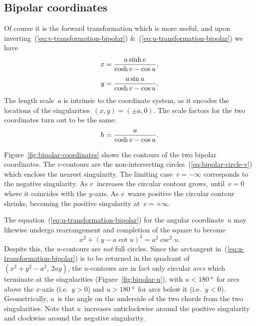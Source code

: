\subsection{Bipolar coordinates}
\label{sec:bipolar.known.coordinates}

Of course it is the forward transformation which is more useful,
and upon inverting~(\ref{eq:v-transformation-bipolar})
\&~(\ref{eq:u-transformation-bipolar})
we have
\begin{align}
  x &= \frac{a \sinh v}{\cosh v - \cos u},
    \label{eq:x-transformation-bipolar}
    \\[\tallspace]
  y &= \frac{a \sin u}{\cosh v - \cos u}.
    \label{eq:y-transformation-bipolar}
\end{align}
The length scale~$a$ is intrinsic to the coordinate system,
as it encodes the locations of the singularities~$(x, y) = (\pm a, 0)$.
The scale factors for the two coordinates turn out to be the same:
\begin{equation}
  \scalefac = \frac{a}{\cosh v - \cos u}.
  \label{eq:scale-factor-bipolar}
\end{equation}

\begin{figure}
\end{figure}

Figure~\ref{fig:bipolar-coordinates} shows the contours
of the two bipolar coordinates.
The $v$-contours are the non-intersecting circles~(\ref{eq:bipolar-circle-v})
which enclose the nearest singularity.
The limiting case~$v = -\infty$ corresponds to the negative singularity.
As $v$~increases the circular contour grows,
until~$v = 0$ where it coincides with the $y$-axis.
As $v$~waxes positive the circular contour shrinks,
becoming the positive singularity at~$v = +\infty$.

The equation~(\ref{eq:u-transformation-bipolar})
for the angular coordinate~$u$
may likewise undergo rearrangement and completion of the square
to become
\begin{equation}
  x^2 + (y - a \cot u)^2 = a^2 \csc^2 u.
  \label{eq:bipolar-circle-u}
\end{equation}
Despite this, the $u$-contours are \emph{not} full circles.
Since the arctangent in~(\ref{eq:u-transformation-bipolar})
is to be returned in the quadrant of~$(x^2 + y^2 - a^2, \, 2 a y)$,
the $u$-contours are in fact
only circular \emph{arcs} which terminate at the singularities
(Figure~\ref{fig:bipolar-u}),
with $u < \SI{180}{\degree}$~for arcs above the $x$-axis (i.e.~$y > 0$)
and $u > \SI{180}{\degree}$~for arcs below it (i.e.~$y < 0$).
Geometrically, $u$~is the angle on the underside of the two chords
from the two singularities.
Note that $u$~increases anticlockwise around the positive singularity
and clockwise around the negative singularity.

